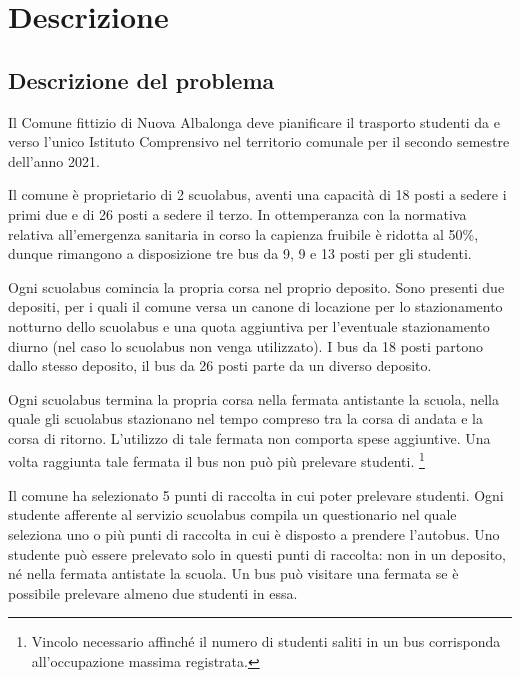 
\chapter{Descrizione}  %
\label{cha:descrizione}
\ifpdf
    \graphicspath{{Chapter2/Figs/Raster/}{Chapter2/Figs/PDF/}{Chapter2/Figs/}}
\else
    \graphicspath{{Chapter2/Figs/Vector/}{Chapter2/Figs/}}
\fi
\section{Descrizione del problema}
Il Comune fittizio di Nuova Albalonga deve pianificare il trasporto studenti da e verso l'unico Istituto Comprensivo nel territorio comunale per il secondo semestre dell'anno 2021.

Il comune è proprietario di 2 scuolabus, aventi una capacità di 18 posti a sedere i primi due e di 26 posti a sedere il terzo. In ottemperanza con la normativa relativa all'emergenza sanitaria in corso la capienza fruibile è ridotta al 50\%, dunque rimangono a disposizione tre bus da 9, 9 e 13 posti per gli studenti.

Ogni scuolabus comincia la propria corsa nel proprio deposito. Sono presenti due depositi, per i quali il comune versa un canone di locazione per lo stazionamento notturno dello scuolabus e una quota aggiuntiva per l'eventuale stazionamento diurno (nel caso lo scuolabus non venga utilizzato). I bus da 18 posti partono dallo stesso deposito, il bus da 26 posti parte da un diverso deposito.

Ogni scuolabus termina la propria corsa nella fermata antistante la scuola, nella quale gli scuolabus stazionano nel tempo compreso tra la corsa di andata e la corsa di ritorno. L'utilizzo di tale fermata non comporta spese aggiuntive. Una volta raggiunta tale fermata il bus non può più prelevare studenti. \footnote{Vincolo necessario affinché il numero di studenti saliti in un bus corrisponda all'occupazione massima registrata.}

Il comune ha selezionato 5 punti di raccolta in cui poter prelevare studenti. Ogni studente afferente al servizio scuolabus compila un questionario nel quale seleziona uno o più punti di raccolta in cui è disposto a prendere l'autobus. Uno studente può essere prelevato solo in questi punti di raccolta: non in un deposito, né nella fermata antistate la scuola. Un bus può visitare una fermata se è possibile prelevare almeno due studenti in essa.

